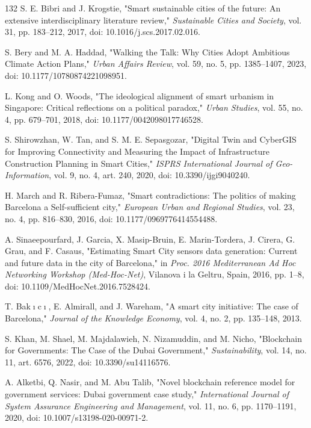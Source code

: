 \documentclass[pdflatex,sn-mathphys-num]{sn-jnl}%
\theoremstyle{thmstyleone}%
\theoremstyle{thmstyletwo}%
\theoremstyle{thmstylethree}%
\begin{document}
\begin{thebibliography}{132}
 S. E. Bibri and J. Krogstie, "Smart sustainable cities of the future: An extensive interdisciplinary literature review," \emph{Sustainable Cities and Society}, vol. 31, pp. 183--212, 2017, doi: 10.1016/j.scs.2017.02.016.

 S. Bery and M. A. Haddad, "Walking the Talk: Why Cities Adopt Ambitious Climate Action Plans," \emph{Urban Affairs Review}, vol. 59, no. 5, pp. 1385--1407, 2023, doi: 10.1177/10780874221098951.

 L. Kong and O. Woods, "The ideological alignment of smart urbanism in Singapore: Critical reflections on a political paradox," \emph{Urban Studies}, vol. 55, no. 4, pp. 679--701, 2018, doi: 10.1177/0042098017746528.

 S. Shirowzhan, W. Tan, and S. M. E. Sepasgozar, "Digital Twin and CyberGIS for Improving Connectivity and Measuring the Impact of Infrastructure Construction Planning in Smart Cities," \emph{ISPRS International Journal of Geo-Information}, vol. 9, no. 4, art. 240, 2020, doi: 10.3390/ijgi9040240.

 H. March and R. Ribera-Fumaz, "Smart contradictions: The politics of making Barcelona a Self-sufficient city," \emph{European Urban and Regional Studies}, vol. 23, no. 4, pp. 816--830, 2016, doi: 10.1177/0969776414554488.

 A. Sinaeepourfard, J. Garcia, X. Masip-Bruin, E. Marin-Tordera, J. Cirera, G. Grau, and F. Casaus, "Estimating Smart City sensors data generation: Current and future data in the city of Barcelona," in \emph{Proc. 2016 Mediterranean Ad Hoc Networking Workshop (Med-Hoc-Net)}, Vilanova i la Geltru, Spain, 2016, pp. 1--8, doi: 10.1109/MedHocNet.2016.7528424.

 T. Bak$\imath$c$\imath$, E. Almirall, and J. Wareham, "A smart city initiative: The case of Barcelona," \emph{Journal of the Knowledge Economy}, vol. 4, no. 2, pp. 135--148, 2013.

 S. Khan, M. Shael, M. Majdalawieh, N. Nizamuddin, and M. Nicho, "Blockchain for Governments: The Case of the Dubai Government," \emph{Sustainability}, vol. 14, no. 11, art. 6576, 2022, doi: 10.3390/su14116576.

 A. Alketbi, Q. Nasir, and M. Abu Talib, "Novel blockchain reference model for government services: Dubai government case study," \emph{International Journal of System Assurance Engineering and Management}, vol. 11, no. 6, pp. 1170--1191, 2020, doi: 10.1007/s13198-020-00971-2.


\end{thebibliography}
\end{document}
